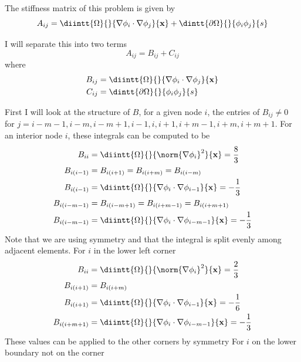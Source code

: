 \documentclass[11pt, titlepage]{article}
\begin{document}
\begin{enumerate}
\begin{enumerate}
        The stiffness matrix of this problem is given by
        \[
          A_{ij} = \diintt{\Omega}{}{\nabla \phi_i \cdot \nabla \phi_j}{\v{x}} + \dintt{\partial \Omega}{}{\phi_i \phi_j}{s}
        \]

        I will separate this into two terms
        \[
          A_{ij} = B_{ij} + C_{ij}
        \]
        where
        \begin{align*}
          B_{ij} &= \diintt{\Omega}{}{\nabla \phi_i \cdot \nabla \phi_j}{\v{x}} \\
          C_{ij} &= \dintt{\partial \Omega}{}{\phi_i \phi_j}{s}
        \end{align*}

        First I will look at the structure of $B$, for a given node $i$, the entries
        of $B_{ij} \neq 0$ for $j = i-m-1, i-m, i-m+1, i-1, i, i+1, i+m-1, i+m, i+m+1$.
        For an interior node $i$, these integrals can be computed to be
        \begin{align*}
          B_{ii} &= \diintt{\Omega}{}{\norm{\nabla \phi_i}^2}{\v{x}} = \frac{8}{3} \\
          B_{i(i-1)} &= B_{i(i+1)} = B_{i(i+m)} = B_{i(i-m)} \\
          B_{i(i-1)} &= \diintt{\Omega}{}{\nabla \phi_i \cdot \nabla \phi_{i-1}}{\v{x}} = -\frac{1}{3} \\
          B_{i(i-m-1)} &= B_{i(i-m+1)} = B_{i(i+m-1)} = B_{i(i+m+1)} \\
          B_{i(i-m-1)} &= \diintt{\Omega}{}{\nabla \phi_i \cdot \nabla \phi_{i-m-1}}{\v{x}} = -\frac{1}{3} \\
        \end{align*}
        Note that we are using symmetry and that the integral is split
        evenly among adjacent elements.
        For $i$ in the lower left corner
        \begin{align*}
          B_{ii} &= \diintt{\Omega}{}{\norm{\nabla \phi_i}^2}{\v{x}} = \frac{2}{3} \\
          B_{i(i+1)} &= B_{i(i+m)} \\
          B_{i(i+1)} &= \diintt{\Omega}{}{\nabla \phi_i \cdot \nabla \phi_{i-1}}{\v{x}} = -\frac{1}{6} \\
          B_{i(i+m+1)} &= \diintt{\Omega}{}{\nabla \phi_i \cdot \nabla \phi_{i-m-1}}{\v{x}} = -\frac{1}{3} \\
        \end{align*}
        These values can be applied to the other corners by symmetry
        For $i$ on the lower boundary not on the corner

\end{enumerate}
\end{enumerate}
\end{document}

